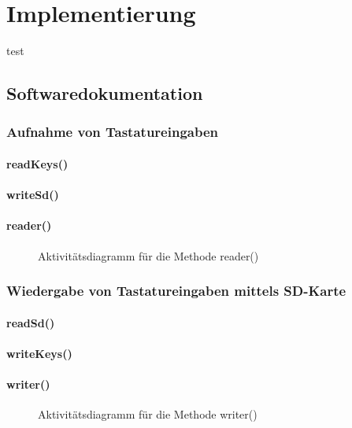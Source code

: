 \chapter{Implementierung}
test



\section{Softwaredokumentation}

\subsection{Aufnahme von Tastatureingaben}
\subsubsection{readKeys()}
\subsubsection{writeSd()}
\subsubsection{reader()}
\begin{figure}
  \centering
  \caption{Aktivitätsdiagramm für die Methode reader()}
  \label{diagram_reader}
\end{figure}

\subsection{Wiedergabe von Tastatureingaben mittels SD-Karte}
\subsubsection{readSd()}
\subsubsection{writeKeys()}
\subsubsection{writer()}
\begin{figure}
  \centering
  \caption{Aktivitätsdiagramm für die Methode writer()}
  \label{diagram_writer}
\end{figure}

